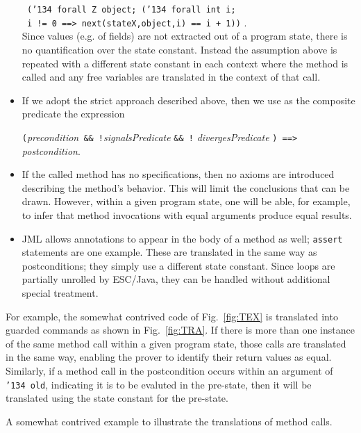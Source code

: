 \documentclass{sig-alternate}
\begin{document}
\begin{itemize}
{\indent \texttt{ (\char'134 forall Z object; (\char'134 forall int i;  }\\ 
\indent \texttt{ i != 0 ==> next(stateX,object,i) == i + 1))} .} \\
Since values (e.g. of fields) are not extracted out of a program state, there is no quantification over
the state constant.  Instead the assumption above is repeated with a different state constant
in each context where the method
is called and any free variables are translated in the context of that call.
\item If we adopt the strict approach described above, then we use as the composite predicate
the expression
\begin{center}{\tt (}{\em precondition}\texttt{ \&\& !}{\em signalsPredicate} {\tt \&\& !} {\em divergesPredicate} {\tt ) ==> }{\em postcondition}.\end{center}

\item If the called method has no specifications, then no axioms are introduced
describing the method's behavior.  This will limit the conclusions that can be drawn.
However, within a
given program state, one will be able, for example, to infer that method invocations with
equal arguments produce equal results.
\item JML allows annotations to appear in the body of a method as well; \texttt{assert}
statements are one example.  These are translated in the same way as postconditions; they simply
use a different state constant.  Since loops are partially unrolled by ESC/Java, they can be
handled without additional special treatment.
\end{itemize}

For example, the somewhat contrived code of Fig.~\ref{fig:TEX} is translated into guarded 
commands as shown in Fig.~\ref{fig:TRA}.  If 
there is
more than one instance of the same method call within a given program state, those calls are
translated in the same way, enabling the prover to identify their return values as equal.  Similarly, if
a method call in the postcondition occurs within 
an argument of \texttt{\char'134 old}, indicating it is to
be evaluted in the pre-state, then it will be translated using the state constant for the pre-state.

\begin{BFIGURE}

\caption{A somewhat contrived example to illustrate the translations of method calls.
}
\label{fig:TEX}
\end{BFIGURE}
\end{document}
